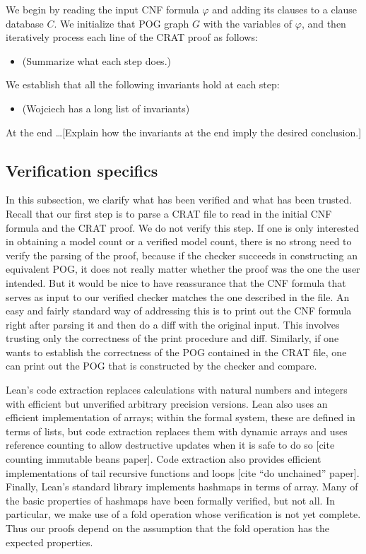 We begin by reading the input CNF formula $\varphi$ and adding its clauses to a clause
database $C$. We initialize that POG graph $G$ with the variables of $\varphi$,
and then iteratively process each line of the CRAT proof as follows:
\begin{itemize}
  \item (Summarize what each step does.)
\end{itemize}
We establish that all the following invariants hold at each step:
\begin{itemize}
  \item (Wojciech has a long list of invariants)
\end{itemize}
At the end \ldots [Explain how the invariants at the end imply the desired conclusion.]

\subsection{Verification specifics}
\label{subsection:verification:specifics}

In this subsection, we clarify what has been verified and what has been trusted.
Recall that our first step is to parse a CRAT file to read in the initial CNF formula
and the CRAT proof. We do not verify this step.
If one is only interested in obtaining a model count or a verified model count,
there is no strong need to verify the parsing of the proof,
because if the checker succeeds in constructing an equivalent POG,
it does not really matter whether the proof was the one the user intended.
But it would be nice to have reassurance that the CNF formula that serves
as input to our verified checker matches the one described in the file.
An easy and fairly standard way of addressing this is to print out the CNF formula
right after parsing it and then do a diff with the original input.
This involves trusting only the correctness of the print procedure and diff.
Similarly, if one wants to establish the correctness of the POG contained in the CRAT file,
one can print out the POG that is constructed by the checker and compare.

Lean's code extraction replaces calculations with natural numbers and integers with
efficient but unverified arbitrary precision versions.
Lean also uses an efficient implementation of arrays; within the
formal system, these are defined in terms of lists, but code extraction replaces them
with dynamic arrays and uses reference counting to allow destructive updates when it is safe
to do so [cite counting immutable beans paper].
Code extraction also provides efficient implementations of tail recursive functions and loops
[cite ``do unchained'' paper].
Finally, Lean's standard library implements hashmaps in terms of array.
Many of the basic properties of hashmaps have been formally verified, but not all.
In particular, we make use of a fold operation whose verification is not yet complete.
Thus our proofs depend on the assumption that the fold operation has the
expected properties.

